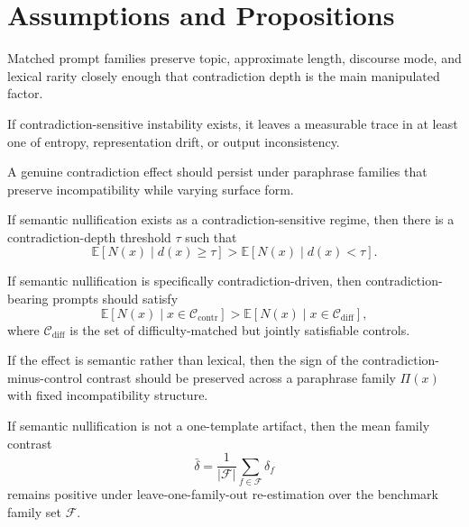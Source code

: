 \documentclass{svjour3}
\begin{document}
\section{Assumptions and Propositions}
\begin{assumption}
Matched prompt families preserve topic, approximate length, discourse mode, and lexical rarity closely enough that contradiction depth is the main manipulated factor.
\end{assumption}

\begin{assumption}
If contradiction-sensitive instability exists, it leaves a measurable trace in at least one of entropy, representation drift, or output inconsistency.
\end{assumption}

\begin{assumption}
A genuine contradiction effect should persist under paraphrase families that preserve incompatibility while varying surface form.
\end{assumption}

\begin{proposition}
If semantic nullification exists as a contradiction-sensitive regime, then there is a contradiction-depth threshold $\tau$ such that
\[
\mathbb{E}[N(x)\mid d(x)\ge\tau]>\mathbb{E}[N(x)\mid d(x)<\tau].
\]
\end{proposition}

\begin{proposition}
If semantic nullification is specifically contradiction-driven, then contradiction-bearing prompts should satisfy
\[
\mathbb{E}[N(x)\mid x\in\mathcal{C}_{\text{contr}}]>\mathbb{E}[N(x)\mid x\in\mathcal{C}_{\text{diff}}],
\]
where $\mathcal{C}_{\text{diff}}$ is the set of difficulty-matched but jointly satisfiable controls.
\end{proposition}

\begin{proposition}
If the effect is semantic rather than lexical, then the sign of the contradiction-minus-control contrast should be preserved across a paraphrase family $\Pi(x)$ with fixed incompatibility structure.
\end{proposition}

\begin{proposition}
If semantic nullification is not a one-template artifact, then the mean family contrast
\[
\bar{\delta}=\frac{1}{|\mathcal{F}|}\sum_{f\in\mathcal{F}}\delta_f
\]
remains positive under leave-one-family-out re-estimation over the benchmark family set $\mathcal{F}$.
\end{proposition}
\end{document}
